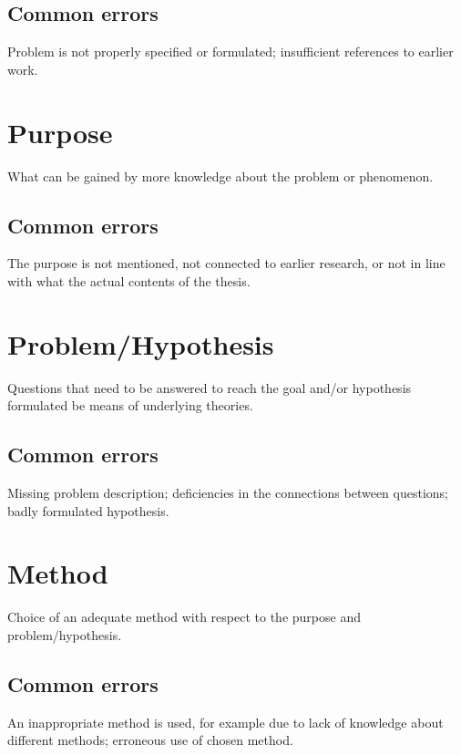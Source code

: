     \subsection{Common errors}
    Problem is not properly specified or formulated; insufficient references to earlier work.  
    
    \section{Purpose}
    What can be gained by more knowledge about the problem or phenomenon. 
    \subsection{Common errors}
    The purpose is not mentioned, not connected to earlier research, or not in line with what the actual contents of the thesis.  
    
    \section{Problem/Hypothesis} 
    Questions that need to be answered to reach 
    the goal and/or hypothesis formulated be means of 
    underlying theories. 
    \subsection{Common errors}
    Missing problem description; deficiencies in the connections between questions; badly formulated 
    hypothesis.  
    
    \section{Method} 
    Choice of an adequate method with respect to the 
    purpose and problem/hypothesis. 
    
    \subsection{Common errors}
    An inappropriate method is used, for example due to lack of knowledge about different methods; 
    erroneous use of chosen method.  
\fi